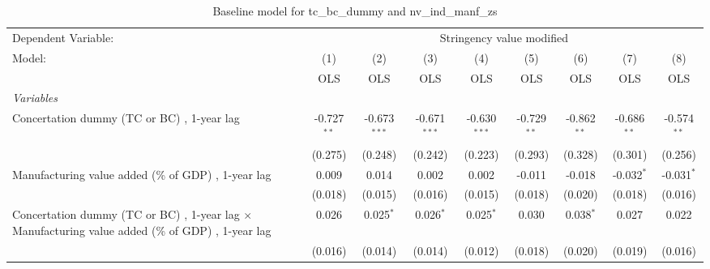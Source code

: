 
\begin{table}[htbp]
   \caption{Baseline model for tc\_bc\_dummy and nv\_ind\_manf\_zs}
   \centering
   \begin{tabular}{lcccccccc}
      \toprule
      Dependent Variable: & \multicolumn{8}{c}{Stringency value modified}\\
      Model:                                                                                                   & (1)           & (2)            & (3)            & (4)            & (5)           & (6)           & (7)           & (8)\\  
                                                                                                               &  OLS          & OLS            & OLS            & OLS            & OLS           & OLS           & OLS           & OLS\\  
      \midrule
      \emph{Variables}\\
      Concertation dummy (TC or BC) , 1-year lag                                                               & -0.727$^{**}$ & -0.673$^{***}$ & -0.671$^{***}$ & -0.630$^{***}$ & -0.729$^{**}$ & -0.862$^{**}$ & -0.686$^{**}$ & -0.574$^{**}$\\   
                                                                                                               & (0.275)       & (0.248)        & (0.242)        & (0.223)        & (0.293)       & (0.328)       & (0.301)       & (0.256)\\   
      Manufacturing value added (\% of GDP) , 1-year lag                                                       & 0.009         & 0.014          & 0.002          & 0.002          & -0.011        & -0.018        & -0.032$^{*}$  & -0.031$^{*}$\\   
                                                                                                               & (0.018)       & (0.015)        & (0.016)        & (0.015)        & (0.018)       & (0.020)       & (0.018)       & (0.016)\\   
      Concertation dummy (TC or BC) , 1-year lag $\times$ Manufacturing value added (\% of GDP) , 1-year lag   & 0.026         & 0.025$^{*}$    & 0.026$^{*}$    & 0.025$^{*}$    & 0.030         & 0.038$^{*}$   & 0.027         & 0.022\\   
                                                                                                               & (0.016)       & (0.014)        & (0.014)        & (0.012)        & (0.018)       & (0.020)       & (0.019)       & (0.016)\\   

\end{tabular}
\end{table}
